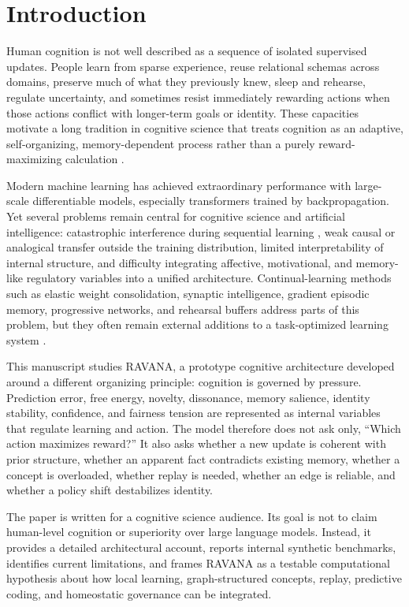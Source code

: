 \documentclass[11pt]{article}
\begin{document}
\section{Introduction}
Human cognition is not well described as a sequence of isolated supervised updates. People learn from sparse experience, reuse relational schemas across domains, preserve much of what they previously knew, sleep and rehearse, regulate uncertainty, and sometimes resist immediately rewarding actions when those actions conflict with longer-term goals or identity. These capacities motivate a long tradition in cognitive science that treats cognition as an adaptive, self-organizing, memory-dependent process rather than a purely reward-maximizing calculation \cite{hebb1949,grossberg1980,mcclelland1995,friston2010,kumaran2016}.

Modern machine learning has achieved extraordinary performance with large-scale differentiable models, especially transformers trained by backpropagation. Yet several problems remain central for cognitive science and artificial intelligence: catastrophic interference during sequential learning \cite{mccloskey1989,french1999}, weak causal or analogical transfer outside the training distribution, limited interpretability of internal structure, and difficulty integrating affective, motivational, and memory-like regulatory variables into a unified architecture. Continual-learning methods such as elastic weight consolidation, synaptic intelligence, gradient episodic memory, progressive networks, and rehearsal buffers address parts of this problem, but they often remain external additions to a task-optimized learning system \cite{kirkpatrick2017,zenke2017,lopezpaz2017,rusu2016,rebuffi2017}.

This manuscript studies RAVANA, a prototype cognitive architecture developed around a different organizing principle: cognition is governed by pressure. Prediction error, free energy, novelty, dissonance, memory salience, identity stability, confidence, and fairness tension are represented as internal variables that regulate learning and action. The model therefore does not ask only, ``Which action maximizes reward?'' It also asks whether a new update is coherent with prior structure, whether an apparent fact contradicts existing memory, whether a concept is overloaded, whether replay is needed, whether an edge is reliable, and whether a policy shift destabilizes identity.

The paper is written for a cognitive science audience. Its goal is not to claim human-level cognition or superiority over large language models. Instead, it provides a detailed architectural account, reports internal synthetic benchmarks, identifies current limitations, and frames RAVANA as a testable computational hypothesis about how local learning, graph-structured concepts, replay, predictive coding, and homeostatic governance can be integrated.
\end{document}
